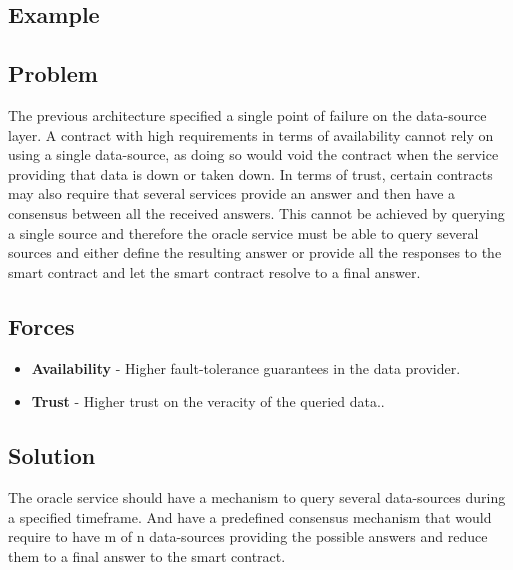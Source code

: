 \subsection{Example}

\subsection{Problem}
The previous architecture specified a single point of failure on the data-source layer. A contract with high requirements in terms of availability cannot rely on using a single data-source, as doing so would void the contract when the service providing that data is down or taken down. In terms of trust, certain contracts may also require that several services provide an answer and then have a consensus between all the received answers. This cannot be achieved by querying a single source and therefore the oracle service must be able to query several sources and either define the resulting answer or provide all the responses to the smart contract and let the smart contract resolve to a final answer.

\subsection{Forces}
\begin{itemize}
  \item \textbf{Availability} - Higher fault-tolerance guarantees in the data provider.
  \item \textbf{Trust} - Higher trust on the veracity of the queried data..
\end{itemize}

\subsection{Solution}
The oracle service should have a mechanism to query several data-sources during a specified timeframe. And have a predefined consensus mechanism that would require to have m of n data-sources providing the possible answers and reduce them to a final answer to the smart contract.


